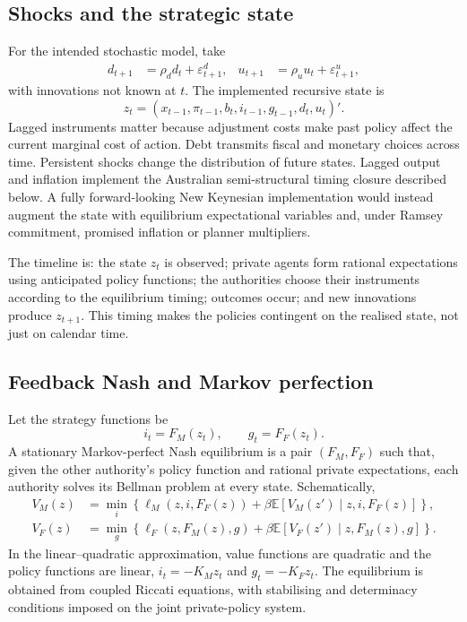 \documentclass[11pt]{article}
\newcommand{\E}{\mathbb{E}}
\begin{document}
\subsection{Shocks and the strategic state}

For the intended stochastic model, take
\begin{align}
 d_{t+1}&=\rho_d d_t+\varepsilon^d_{t+1}, &
 u_{t+1}&=\rho_u u_t+\varepsilon^u_{t+1},                       \label{eq:shocks}
\end{align}
with innovations not known at $t$.  The implemented recursive state is
\begin{equation}
 z_t=(x_{t-1},\pi_{t-1},b_t,i_{t-1},g_{t-1},d_t,u_t)' .          \label{eq:state}
\end{equation}
Lagged instruments matter because adjustment costs make past policy affect the
current marginal cost of action.  Debt transmits fiscal and monetary choices
across time.  Persistent shocks change the distribution of future states.
Lagged output and inflation implement the Australian semi-structural timing
closure described below.  A fully forward-looking New Keynesian implementation
would instead augment the state with equilibrium expectational variables and,
under Ramsey commitment, promised inflation or planner multipliers.

The timeline is: the state $z_t$ is observed; private agents form rational
expectations using anticipated policy functions; the authorities choose their
instruments according to the equilibrium timing; outcomes occur; and new
innovations produce $z_{t+1}$.  This timing makes the policies contingent on
the realised state, not just on calendar time.

\subsection{Feedback Nash and Markov perfection}

Let the strategy functions be
\begin{equation}
 i_t=F_M(z_t),\qquad g_t=F_F(z_t).                               \label{eq:feedback}
\end{equation}
A stationary Markov-perfect Nash equilibrium is a pair $(F_M,F_F)$ such that,
given the other authority's policy function and rational private expectations,
each authority solves its Bellman problem at every state.  Schematically,
\begin{align}
 V_M(z)&=\min_i\left\{\ell_M(z,i,F_F(z))+
          \beta\E[V_M(z')\mid z,i,F_F(z)]\right\},             \label{eq:bellmanM}\\
 V_F(z)&=\min_g\left\{\ell_F(z,F_M(z),g)+
          \beta\E[V_F(z')\mid z,F_M(z),g]\right\}.             \label{eq:bellmanF}
\end{align}
In the linear--quadratic approximation, value functions are quadratic and the
policy functions are linear, $i_t=-K_Mz_t$ and $g_t=-K_Fz_t$.  The equilibrium
is obtained from coupled Riccati equations, with stabilising and determinacy
conditions imposed on the joint private-policy system.
\end{document}
